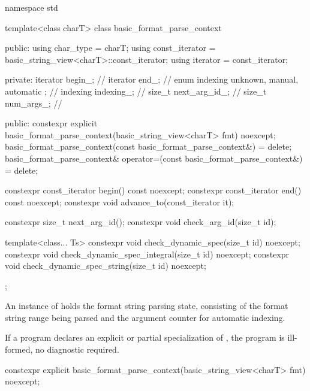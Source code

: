 %
%
%
%
\begin{codeblock}
namespace std {
  template<class charT>
  class basic_format_parse_context {
  public:
    using char_type = charT;
    using const_iterator = basic_string_view<charT>::const_iterator;
    using iterator = const_iterator;

  private:
    iterator begin_;                                    // \expos
    iterator end_;                                      // \expos
    enum indexing { unknown, manual, automatic };       // \expos
    indexing indexing_;                                 // \expos
    size_t next_arg_id_;                                // \expos
    size_t num_args_;                                   // \expos

  public:
    constexpr explicit basic_format_parse_context(basic_string_view<charT> fmt) noexcept;
    basic_format_parse_context(const basic_format_parse_context&) = delete;
    basic_format_parse_context& operator=(const basic_format_parse_context&) = delete;

    constexpr const_iterator begin() const noexcept;
    constexpr const_iterator end() const noexcept;
    constexpr void advance_to(const_iterator it);

    constexpr size_t next_arg_id();
    constexpr void check_arg_id(size_t id);

    template<class... Ts>
      constexpr void check_dynamic_spec(size_t id) noexcept;
    constexpr void check_dynamic_spec_integral(size_t id) noexcept;
    constexpr void check_dynamic_spec_string(size_t id) noexcept;
  };
}
\end{codeblock}

\pnum
An instance of  holds
the format string parsing state, consisting of
the format string range being parsed and
the argument counter for automatic indexing.

\pnum
If a program declares an explicit or partial specialization of
,
the program is ill-formed, no diagnostic required.

%
\begin{itemdecl}
constexpr explicit basic_format_parse_context(basic_string_view<charT> fmt) noexcept;
\end{itemdecl}

